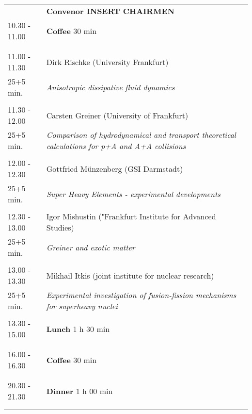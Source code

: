 \begin{longtable}{p{3cm}p{13cm}}
&\hfill {\bf Convenor INSERT CHAIRMEN }\\ 
10.30 - 11.00 & {\bf Coffee} \hfill 30 min \\ 
 & \\ 
 & \\ 
11.00 - 11.30 & Dirk Rischke (University Frankfurt)\\ 
25+5 min. & {\it Anisotropic dissipative fluid dynamics}\\ 
 & \\ 
11.30 - 12.00 & Carsten Greiner (University of Frankfurt)\\ 
25+5 min. & {\it Comparison of hydrodynamical and transport theoretical calculations for p+A and A+A collisions}\\ 
 & \\ 
12.00 - 12.30 & Gottfried Münzenberg (GSI Darmstadt)\\ 
25+5 min. & {\it Super Heavy Elements -  experimental developments}\\ 
 & \\ 
12.30 - 13.00 & Igor Mishustin ("Frankfurt Institute for Advanced Studies)\\ 
25+5 min. & {\it Greiner and exotic matter}\\ 
 & \\ 
13.00 - 13.30 & Mikhail Itkis (joint institute for nuclear research)\\ 
25+5 min. & {\it Experimental investigation of fusion-fission mechanisms for superheavy nuclei}\\ 
 & \\ 
13.30 - 15.00 & {\bf Lunch} \hfill 1 h 30 min \\ 
 & \\ 
 & \\ 
16.00 - 16.30 & {\bf Coffee} \hfill 30 min \\ 
 & \\ 
 & \\ 
20.30 - 21.30 & {\bf Dinner} \hfill 1 h 00 min \\ 
 & \\ 
 & \\ 
\end{longtable}

